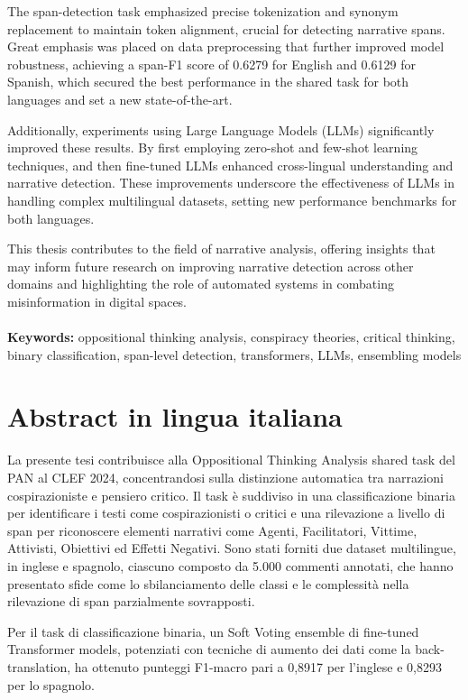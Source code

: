 \documentclass{Configuration_Files/PoliMi3i_thesis}
\begin{document}
The span-detection task emphasized precise tokenization and synonym replacement to maintain token alignment, crucial for detecting narrative spans. Great emphasis was placed on data preprocessing that further improved model robustness, achieving a span-F1 score of 0.6279 for English and 0.6129 for Spanish, which secured the best performance in the shared task for both languages and set a new state-of-the-art.

Additionally, experiments using Large Language Models (LLMs) significantly improved these results. By first employing zero-shot and few-shot learning techniques, and then fine-tuned LLMs enhanced cross-lingual understanding and narrative detection. These improvements underscore the effectiveness of LLMs in handling complex multilingual datasets, setting new performance benchmarks for both languages.

This thesis contributes to the field of narrative analysis, offering insights that may inform future research on improving narrative detection across other domains and highlighting the role of automated systems in combating misinformation in digital spaces.
\\
\\
\textbf{Keywords:} oppositional thinking analysis, conspiracy theories, critical thinking, binary classification, span-level detection, transformers, LLMs, ensembling models %

\chapter*{Abstract in lingua italiana}
La presente tesi contribuisce alla Oppositional Thinking Analysis shared task del PAN al CLEF 2024, concentrandosi sulla distinzione automatica tra narrazioni cospirazioniste e pensiero critico. Il task è suddiviso in una classificazione binaria per identificare i testi come cospirazionisti o critici e una rilevazione a livello di span per riconoscere elementi narrativi come Agenti, Facilitatori, Vittime, Attivisti, Obiettivi ed Effetti Negativi. Sono stati forniti due dataset multilingue, in inglese e spagnolo, ciascuno composto da 5.000 commenti annotati, che hanno presentato sfide come lo sbilanciamento delle classi e le complessità nella rilevazione di span parzialmente sovrapposti.

Per il task di classificazione binaria, un Soft Voting ensemble di fine-tuned Transformer models, potenziati con tecniche di aumento dei dati come la back-translation, ha ottenuto punteggi F1-macro pari a 0,8917 per l'inglese e 0,8293 per lo spagnolo.
\end{document}
